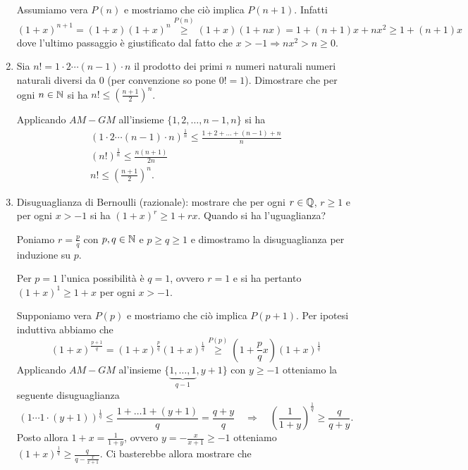 \documentclass[a4paper]{article}\par \usepackage{style}\par
\begin{document}
\begin{enumerate}
\begin{pbase}
  \end{pbase}
  \begin{pind}
    Assumiamo vera $ P(n) $ e mostriamo che ciò implica $ P(n + 1) $. Infatti \[(1 + x)^{n + 1} = (1 + x) (1 + x)^n \overset{P(n)}{\geq} (1 + x)(1 + nx) = 1 + (n + 1)x + n x^2 \geq 1 + (n + 1)x\] dove l'ultimo passaggio è giustificato dal fatto che $ x > -1 \Rightarrow nx^2 > n \geq 0 $.
  \end{pind}
\item Sia $ n! = 1 \cdot 2 \cdots (n - 1) \cdot n $ il prodotto dei primi $ n $ numeri naturali numeri naturali diversi da 0 (per convenzione so pone $ 0! = 1 $). Dimostrare che per ogni $ n \in \mathbb{N} $ si ha $ n! \leq \left(\frac{n + 1}{2}\right)^n $. \\\par   Applicando $ AM - GM $ all'insieme $ \{1, 2, \dots, n - 1, n\} $ si ha
  \begin{gather*}
    (1 \cdot 2 \cdots (n - 1) \cdot n)^\frac{1}{n} \leq \frac{1 + 2 + \dots + (n - 1) + n}{n} \\
    (n!)^\frac{1}{n} \leq \frac{n (n + 1)}{2n} \\
    n! \leq \left(\frac{n + 1}{2}\right)^n.
  \end{gather*}
\item Disuguaglianza di Bernoulli (razionale): mostrare che per ogni $ r \in \mathbb{Q} $, $ r \geq 1 $ e per ogni $ x > -1 $ si ha $ (1 + x)^r \geq 1 + rx $. Quando si ha l'uguaglianza? \\\par   Poniamo $ r = \frac{p}{q} $ con $ p, q \in \mathbb{N} $ e $ p \geq q \geq 1 $ e dimostramo la disuguaglianza per induzione su $ p $.
  \begin{pbase}
    Per $ p = 1 $ l'unica possibilità è $ q = 1 $, ovvero $ r = 1 $ e si ha pertanto $ (1      + x)^1 \geq 1 + x $ per ogni $ x > -1 $.
  \end{pbase}
  \begin{pind}
    Supponiamo vera $ P(p) $ e mostriamo che ciò implica $ P(p + 1) $. Per ipotesi induttiva abbiamo che \[(1 + x)^\frac{p + 1}{q} = (1 + x)^\frac{p}{q} (1 + x)^\frac{1}{q} \overset{P(p)}{\geq} \left(1 + \frac{p}{q}x\right)(1 + x)^\frac{1}{q}\]
    Applicando $ AM - GM $ al'insieme $ \{\underset{q - 1}{\underbrace{1, \dots, 1}}, y + 1\} $ con $ y \geq -1 $ otteniamo la seguente disuguaglianza \[(1 \cdots 1 \cdot (y + 1))^\frac{1}{q} \leq \frac{1 + \dots 1 + (y + 1)}{q} = \frac{q + y}{q} \quad \Rightarrow \quad \left(\frac{1}{1 + y}\right)^\frac{1}{q} \geq \frac{q}{q + y}.\] Posto allora $ 1 + x = \frac{1}{1 + y} $, ovvero $ y = -\frac{x}{x + 1} \geq -1 $ otteniamo $ (1 + x)^\frac{1}{q} \geq \frac{q}{q - \frac{x}{x + 1}} $. Ci basterebbe allora mostrare che

\end{pind}
\end{enumerate}
\end{document}
